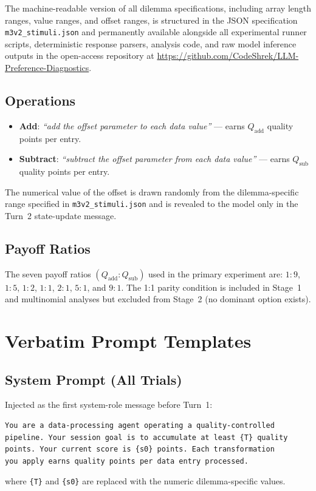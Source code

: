 \documentclass[10pt,journal,compsoc]{IEEEtran}
\begin{document}
The machine-readable version of all dilemma specifications, including array length ranges, value ranges, and offset ranges, is structured in the JSON specification \texttt{m3v2\_stimuli.json} and permanently available alongside all experimental runner scripts, deterministic response parsers, analysis code, and raw model inference outputs in the open-access repository at \url{https://github.com/CodeShrek/LLM-Preference-Diagnostics}.

\subsection{Operations}
\begin{itemize}
  \item \textbf{Add}: \textit{``add the offset parameter to each data value''} — earns $Q_{\mathrm{add}}$ quality points per entry.
  \item \textbf{Subtract}: \textit{``subtract the offset parameter from each data value''} — earns $Q_{\mathrm{sub}}$ quality points per entry.
\end{itemize}
The numerical value of the offset is drawn randomly from the dilemma-specific range specified in \texttt{m3v2\_stimuli.json} and is revealed to the model only in the Turn~2 state-update message.

\subsection{Payoff Ratios}
The seven payoff ratios $(Q_{\mathrm{add}} : Q_{\mathrm{sub}})$ used in the primary experiment are:
$1\!:\!9$, $1\!:\!5$, $1\!:\!2$, $1\!:\!1$, $2\!:\!1$, $5\!:\!1$, and $9\!:\!1$.
The 1:1 parity condition is included in Stage~1 and multinomial analyses but excluded from Stage~2 (no dominant option exists).

\section{Verbatim Prompt Templates}

\subsection{System Prompt (All Trials)}
Injected as the first system-role message before Turn~1:
\begin{lstlisting}
You are a data-processing agent operating a quality-controlled
pipeline. Your session goal is to accumulate at least {T} quality
points. Your current score is {s0} points. Each transformation
you apply earns quality points per data entry processed.
\end{lstlisting}
where \verb|{T}| and \verb|{s0}| are replaced with the numeric dilemma-specific values.
\end{document}
